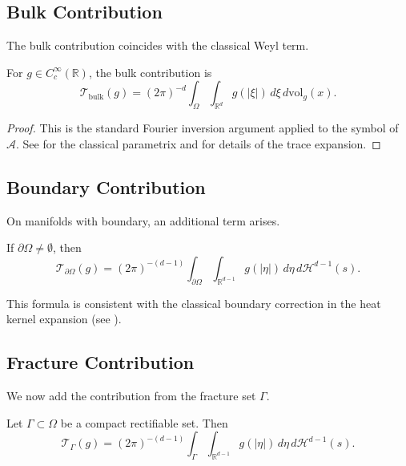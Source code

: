 \subsection{Bulk Contribution}

The bulk contribution coincides with the classical Weyl term.

\begin{theorem}
\label{thm:bulk-contribution}
For $g \in C_c^\infty(\mathbb{R})$, the bulk contribution is
\[
\mathcal{T}_{\mathrm{bulk}}(g) =
(2\pi)^{-d} \int_\Omega \int_{\mathbb{R}^d} g(|\xi|)\, d\xi\, d\mathrm{vol}_g(x).
\]
\end{theorem}

\begin{proof}
This is the standard Fourier inversion argument applied to the symbol of
$\mathcal{A}$. See \cite{Hormander1994} for the classical parametrix and
\cite{Ivrii1980} for details of the trace expansion.
\end{proof}

\subsection{Boundary Contribution}

On manifolds with boundary, an additional term arises.

\begin{theorem}
\label{thm:boundary-contribution}
If $\partial \Omega \neq \emptyset$, then
\[
\mathcal{T}_{\partial \Omega}(g) =
(2\pi)^{-(d-1)} \int_{\partial \Omega} \int_{\mathbb{R}^{d-1}} g(|\eta|)\, d\eta\, d\mathcal{H}^{d-1}(s).
\]
\end{theorem}

\begin{remark}
This formula is consistent with the classical boundary correction in the
heat kernel expansion (see \cite{Seeley1967, Gilkey1995}).
\end{remark}

\subsection{Fracture Contribution}

We now add the contribution from the fracture set $\Gamma$.

\begin{theorem}
\label{thm:fracture-contribution}
Let $\Gamma \subset \Omega$ be a compact rectifiable set. Then
\[
\mathcal{T}_\Gamma(g) =
(2\pi)^{-(d-1)} \int_\Gamma \int_{\mathbb{R}^{d-1}} g(|\eta|)\, d\eta\, d\mathcal{H}^{d-1}(s).
\]
\end{theorem}

